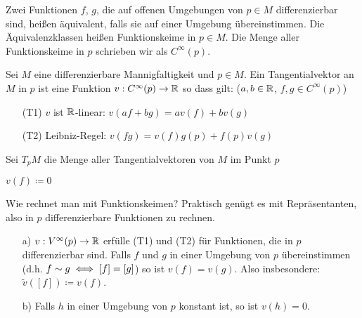 \documentclass[a4paper,twoside,DIV15,BCOR12mm]{scrbook}
\renewcommand{\da}{\coloneqq}
\begin{document}
\begin{definition}[Funktionskeim]
Zwei Funktionen $f$, $g$, die auf offenen Umgebungen von $p\in M$ differenzierbar sind, heißen äquivalent, falls sie auf einer Umgebung übereinstimmen. Die Äquivalenzklassen heißen Funktionskeime in $p\in M$. Die Menge aller Funktionskeime in $p$ schrieben wir als $C^\infty(p)$.
\end{definition}

\begin{definition}[Tangentialvektor]
Sei $M$ eine differenzierbare Mannigfaltigkeit und $p\in M$. Ein Tangentialvektor an $M$ in $p$ ist eine Funktion $v:C^\infty(p) \to \mathbb{R}$ so dass gilt: ($a,b\in\mathbb{R}$, $f,g\in C^\infty(p)$)
\begin{itemize}
\item[(T1)] $v$ ist $\mathbb{R}$-linear: $v(af + bg) = a v(f) + b v(g)$
\item[(T2)] Leibniz-Regel: $v(fg) = v(f)g(p) + f(p)v(g)$ 
\end{itemize}
Sei $T_pM$ die Menge aller Tangentialvektoren von $M$ im Punkt $p$
\end{definition}

\begin{beispiel}
$v(f) \da 0$
\end{beispiel}

Wie rechnet man mit Funktionskeimen? Praktisch genügt es mit Repräsentanten, also in $p$ differenzierbare Funktionen zu rechnen.

\begin{lemma}
\begin{itemize}
\item[a)]
$v:V^\infty(p) \to \mathbb{R}$ erfülle (T1) und (T2) für Funktionen, die in $p$ differenzierbar sind. Falls $f$ und $g$ in einer Umgebung von $p$ übereinstimmen (d.h. $f\sim g \iff [f] = [g]$) so ist $v(f) = v(g)$. Also insbesondere: $\tilde v([f]) \da v(f)$.
\item[b)]
Falls $h$ in einer Umgebung von $p$ konstant ist, so ist $v(h)=0$.
\end{itemize}
\end{lemma}
\end{document}
